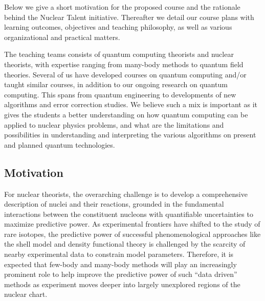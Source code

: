 \documentclass[twocolumn,superscriptaddress,amsmath,amssymb,
aps,floatfix]{revtex4-2}
\begin{document}
Below we give a short motivation for the proposed course and the
rationale behind the Nuclear Talent initiative. Thereafter we detail our
course plans with learning outcomes, objectives and teaching philosophy,
as well as various organizational and practical matters.

The teaching teams consists of quantum computing theorists and nuclear
theorists, with expertise ranging from many-body methods to quantum
field theories. Several of us have developed courses on quantum
computing and/or taught similar courses, in addition to our ongoing
research on quantum computing. This spans from quantum engineering to
developments of new algorithms and error correction studies. We believe
such a mix is important as it gives the students a better understanding
on how quantum computing can be applied to nuclear physics problems, and
what are the limitations and possibilities in understanding and
interpreting the various algorithms on present and planned quantum
technologies.

    \subsection{Motivation}\label{motivation}

For nuclear theorists, the overarching challenge is to develop a
comprehensive description of nuclei and their reactions, grounded in the
fundamental interactions between the constituent nucleons with
quantifiable uncertainties to maximize predictive power. As experimental
frontiers have shifted to the study of rare isotopes, the predictive
power of successful phenomenological approaches like the shell model and
density functional theory is challenged by the scarcity of nearby
experimental data to constrain model parameters. Therefore, it is
expected that few-body and many-body methods will play an increasingly
prominent role to help improve the predictive power of such ``data
driven'' methods as experiment moves deeper into largely unexplored
regions of the nuclear chart.
\end{document}
